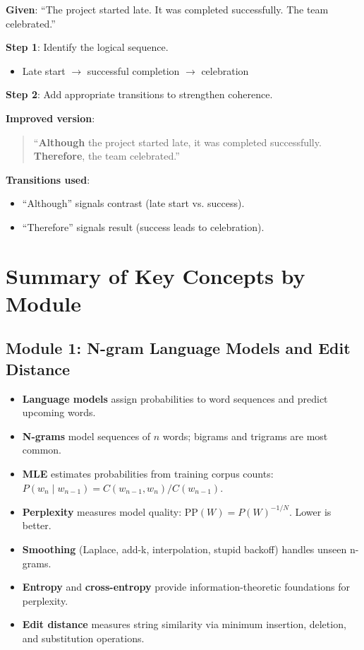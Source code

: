 \documentclass[11pt,a4paper]{article}
\begin{document}
\begin{tcolorbox}[colback=green!5!white,colframe=green!75!black,title=\textbf{Worked Example: Enhancing Global Coherence}]
\textbf{Given}: ``The project started late. It was completed successfully. The team celebrated.''

\textbf{Step 1}: Identify the logical sequence.
\begin{itemize}
    \item Late start $\to$ successful completion $\to$ celebration
\end{itemize}

\textbf{Step 2}: Add appropriate transitions to strengthen coherence.

\textbf{Improved version}:
\begin{quote}
``\textbf{Although} the project started late, it was completed successfully. \textbf{Therefore}, the team celebrated.''
\end{quote}

\textbf{Transitions used}:
\begin{itemize}
    \item ``Although'' signals contrast (late start vs. success).
    \item ``Therefore'' signals result (success leads to celebration).
\end{itemize}
\end{tcolorbox}

\section{Summary of Key Concepts by Module}

\subsection{Module 1: N-gram Language Models and Edit Distance}
\begin{itemize}
    \item \textbf{Language models} assign probabilities to word sequences and predict upcoming words.
    \item \textbf{N-grams} model sequences of $n$ words; bigrams and trigrams are most common.
    \item \textbf{MLE} estimates probabilities from training corpus counts: $P(w_n \mid w_{n-1}) = C(w_{n-1}, w_n) / C(w_{n-1})$.
    \item \textbf{Perplexity} measures model quality: $\text{PP}(W) = P(W)^{-1/N}$. Lower is better.
    \item \textbf{Smoothing} (Laplace, add-k, interpolation, stupid backoff) handles unseen n-grams.
    \item \textbf{Entropy} and \textbf{cross-entropy} provide information-theoretic foundations for perplexity.
    \item \textbf{Edit distance} measures string similarity via minimum insertion, deletion, and substitution operations.
\end{itemize}
\end{document}
